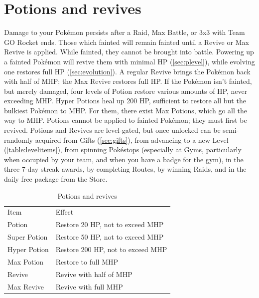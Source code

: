 \section{Potions and revives}
Damage to your Pokémon persists after a Raid, Max Battle, or 3x3 with Team GO Rocket ends.
Those which fainted will remain fainted until a Revive or Max Revive is applied.
While fainted, they cannot be brought into battle.
Powering up a fainted Pokémon will revive them with minimal HP (\autoref{sec:plevel}),
  while evolving one restores full HP (\autoref{sec:evolution}).
A regular Revive brings the Pokémon back with half of MHP; the Max Revive restores full HP.
If the Pokémon isn't fainted, but merely damaged, four levels of Potion
  restore various amounts of HP, never exceeding MHP\@.
Hyper Potions heal up 200 HP, sufficient to restore all but the bulkiest Pokémon to MHP.
For them, there exist Max Potions, which go all the way to MHP.
Potions cannot be applied to fainted Pokémon; they must first be revived.
Potions and Revives are level-gated, but once unlocked can be semi-randomly acquired
  from Gifts (\autoref{sec:gifts}),
  from advancing to a new Level (\autoref{table:levelitems}),
  from spinning Pokéstops (especially at Gyms, particularly when occupied by your team, and when you have a badge for the gym),
  in the three 7-day streak awards,
  by completing Routes,
  by winning Raids,
  and in the daily free package from the Store.
\begin{table}
\begin{center}
\begin{tabular}{ll}
Item & Effect \\
\Midrule
Potion & Restore 20 HP, not to exceed MHP\\
Super Potion & Restore 50 HP, not to exceed MHP\\
Hyper Potion & Restore 200 HP, not to exceed MHP\\
Max Potion & Restore to full MHP\\
Revive & Revive with half of MHP\\
Max Revive & Revive with full MHP\\
\end{tabular}
\end{center}
\caption{Potions and revives}
\label{table:potions}
\end{table}

